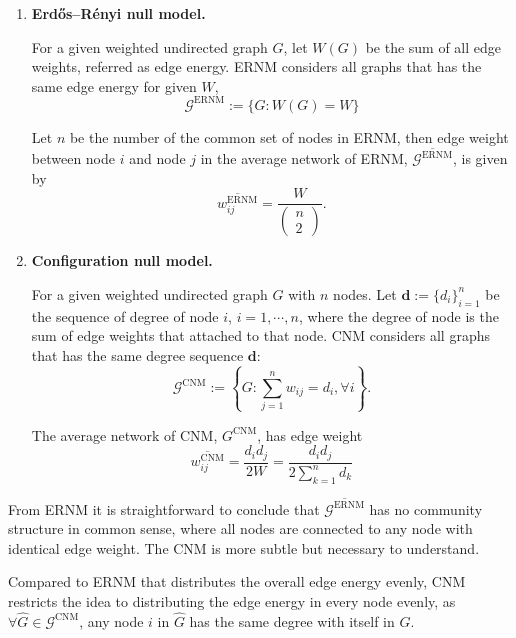 \documentclass[11pt]{article}
\theoremstyle{definition}
\theoremstyle{definition}
\theoremstyle{definition}
\theoremstyle{remark}
\theoremstyle{plain}
\begin{document}
\begin{enumerate}
	\item \textbf{Erdős–Rényi null model.}

	For a given weighted undirected graph $G$, let $W(G)$ be the sum of all edge weights, referred as edge energy. ERNM considers all graphs that has the same edge energy for given $W$,
	\begin{equation}
		\mathcal{G}^{\text{ERNM}}:=\{G: W(G) = W\}
	\end{equation} 
	
	Let $n$ be the number of the common set of nodes in ERNM, then edge weight between node $i$ and node $j$ in the average network of ERNM, $\overline{\mathcal{G}^{\text{ERNM}}}$, is given by
	\begin{equation}
		\overline{w_{ij}^{\text{ERNM}}} = \frac{W}{\begin{pmatrix} n\\ 2\end{pmatrix}}.
	\end{equation}

	\item \textbf{Configuration null model.}
	
	For a given weighted undirected graph $G$ with $n$ nodes. Let $\mathbf{d}:=\{d_i\}_{i=1}^n$ be the sequence of degree of node $i$, $i = 1,\cdots, n$, where the degree of node is the sum of edge weights that attached to that node. CNM considers all graphs that has the same degree sequence $\mathbf{d}$: 
	\begin{equation}
		\mathcal{G}^{\text{CNM}}:= \left\{G: \sum_{j = 1}^n w_{ij} = d_i ,\forall i\right\}.
	\end{equation}

	The average network of CNM, $G^{\text{CNM}}$, has edge weight
	\begin{equation}
		\overline{w_{ij}^{\text{CNM}}} = \frac{d_i d_j}{2W} = \frac{d_i d_j}{2\sum_{k=1}^n{d_k}}
	\end{equation}
\end{enumerate}

From ERNM it is straightforward to conclude that $\overline{\mathcal{G}^{\text{ERNM}}}$ has no community structure in common sense, where all nodes are connected to any node with identical edge weight. The CNM is more subtle but necessary to understand.

Compared to ERNM that distributes the overall edge energy evenly, CNM restricts the idea to distributing the edge energy in every node evenly, as $\forall \hat{G}\in \mathcal{G}^{\text{CNM}}$, any node $i$ in $\hat{G}$ has the same degree with itself in $G$.
\end{document}
